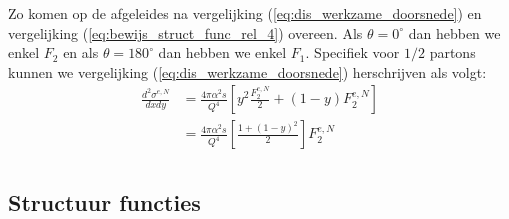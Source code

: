 \documentclass[../main.tex]{subfiles}
\begin{document}
Zo komen op de afgeleides na vergelijking (\ref{eq:dis_werkzame_doorsnede}) en vergelijking (\ref{eq:bewijs_struct_func_rel_4}) overeen. Als $\theta=0^\circ$ dan hebben we enkel $F_2$ en als $\theta=180^\circ$ dan hebben we enkel $F_1$. Specifiek voor $1/2$ partons kunnen we vergelijking (\ref{eq:dis_werkzame_doorsnede}) herschrijven als volgt:
\begin{equation}
    \begin{aligned}
        \label{eq:struct_func_parton}
        \frac{d^2\sigma^{e,N}}{dxdy} &= \frac{4\pi\alpha^2s}{Q^4} \left[y^2 \frac{F_2^{e,N}}{2} + (1-y)F_2^{e,N}\right]\\
                                     &= \frac{4\pi\alpha^2s}{Q^4} \left[\frac{1+(1-y)^2}{2}\right]F_2^{e,N}\\
    \end{aligned}
\end{equation}

\subsection{Structuur functies}%
\label{sub:structuur_functies}
\end{document}
